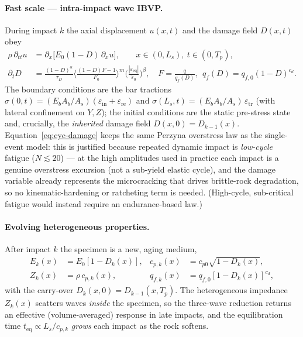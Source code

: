 \documentclass[11pt,a4paper,openany]{book}
\theoremstyle{handbook}
\newcommand{\Ab}{A_b}
\newcommand{\As}{A_s}
\newcommand{\Ls}{L_s}
\begin{document}
\paragraph{Fast scale --- intra-impact wave IBVP.}
During impact $k$ the axial displacement $u(x,t)$ and the damage field $D(x,t)$
obey
%
\begin{align}
\rho\,\partial_{tt}u &= \partial_x\!\big[E_0(1-D)\,\partial_x u\big],
  \qquad x\in(0,\Ls),\ t\in(0,T_p), \label{eq:cyc-wave}\\
\partial_t D &= \frac{(1-D)^{\alpha}}{\tau_D}
  \Big\langle\frac{(1-D)F-1}{F_0}\Big\rangle^{m}
  \Big(\frac{|\dot\varepsilon_{\mathrm{eq}}|}{\dot\varepsilon_0}\Big)^{\beta},
  \quad F=\frac{q}{q_f(D)},\ \ q_f(D)=q_{f,0}(1-D)^{c_d}. \label{eq:cyc-damage}
\end{align}
%
The boundary conditions are the bar tractions
$\sigma(0,t)=(E_b\Ab/\As)(\varepsilon_{\mathrm{in}}+\varepsilon_{\mathrm{re}})$ and
$\sigma(\Ls,t)=(E_b\Ab/\As)\,\varepsilon_{\mathrm{tr}}$ (with lateral confinement on
$Y,Z$); the initial conditions are the static pre-stress state and, crucially, the
\emph{inherited} damage field $D(x,0)=D_{k-1}(x)$. Equation~\eqref{eq:cyc-damage}
keeps the same Perzyna overstress law as the single-event model: this is justified
because repeated dynamic impact is \emph{low-cycle} fatigue ($N\!\lesssim\!20$) ---
at the high amplitudes used in practice each impact is a genuine overstress
excursion (not a sub-yield elastic cycle), and the damage variable already
represents the microcracking that drives brittle-rock degradation, so no
kinematic-hardening or ratcheting term is needed. (High-cycle, sub-critical
fatigue would instead require an endurance-based law.)

\paragraph{Evolving heterogeneous properties.}
After impact $k$ the specimen is a new, aging medium,
%
\begin{equation}
\begin{aligned}
E_k(x)&=E_0[1-D_k(x)], & c_{p,k}(x)&=c_{p0}\sqrt{1-D_k(x)},\\
Z_k(x)&=\rho\,c_{p,k}(x), & q_{f,k}(x)&=q_{f,0}[1-D_k(x)]^{c_d},
\end{aligned}
\label{eq:cyc-coeff}
\end{equation}
%
with the carry-over $D_k(x,0)=D_{k-1}(x,T_p)$. The heterogeneous impedance
$Z_k(x)$ scatters waves \emph{inside} the specimen, so the three-wave reduction
returns an effective (volume-averaged) response in late impacts, and the
equilibration time $t_{\mathrm{eq}}\propto\Ls/c_{p,k}$ \emph{grows} each impact as
the rock softens.
\end{document}
